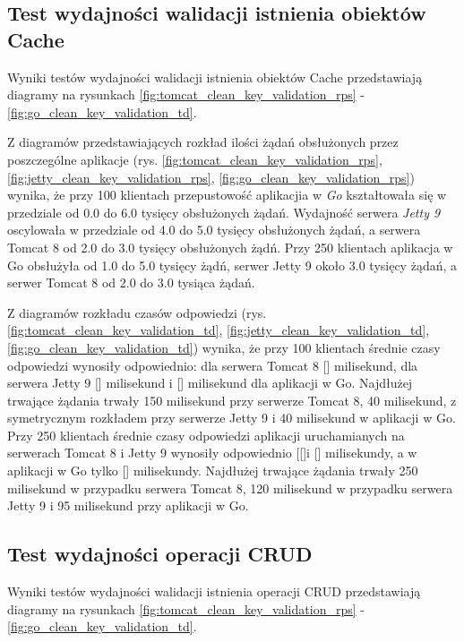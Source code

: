 \subsection{Test wydajności walidacji istnienia obiektów Cache}
Wyniki testów wydajności walidacji istnienia obiektów Cache przedstawiają diagramy na rysunkach \ref{fig:tomcat_clean_key_validation_rps} - \ref{fig:go_clean_key_validation_td}.              

Z diagramów przedstawiających rozkład ilości żądań obsłużonych przez poszczególne aplikacje  (rys. \ref{fig:tomcat_clean_key_validation_rps}, \ref{fig:jetty_clean_key_validation_rps}, \ref{fig:go_clean_key_validation_rps}) wynika, że przy 100 klientach przepustowość aplikacjia w \textsl{Go} kształtowała się w przedziale od 0.0 do 6.0 tysięcy obsłużonych żądań. Wydajność serwera \textsl{Jetty 9} oscylowała w przedziale od 4.0 do 5.0 tysięcy obsłużonych żądań, a  serwera Tomcat 8  od 2.0 do 3.0 tysięcy obsłużonych żądń.  Przy 250 klientach aplikacja w Go obsłużyła od 1.0 do 5.0 tysięcy żądń, serwer Jetty 9 około 3.0 tysięcy żądań, a serwer Tomcat 8 od 2.0 do 3.0 tysiąca żądań.

Z diagramów rozkładu czasów odpowiedzi (rys. \ref{fig:tomcat_clean_key_validation_td}, \ref{fig:jetty_clean_key_validation_td}, \ref{fig:go_clean_key_validation_td}) wynika, że przy 100 klientach średnie czasy odpowiedzi wynosiły odpowiednio: dla serwera Tomcat 8 [] milisekund, dla serwera Jetty 9 [] milisekund i [] milisekund dla aplikacji w Go.  Najdłużej trwające żądania trwały 150 milisekund przy serwerze Tomcat 8, 40 milisekund, z symetrycznym rozkładem przy serwerze  Jetty 9 i 40 milisekund  w aplikacji w Go. Przy 250 klientach średnie czasy odpowiedzi aplikacji uruchamianych na serwerach Tomcat 8 i Jetty 9  wynosiły odpowiednio [[]i [] milisekundy, a w aplikacji w Go tylko [] milisekundy. Najdłużej trwające żądania trwały 250 milisekund w przypadku serwera Tomcat 8, 120 milisekund w przypadku serwera Jetty 9 i 95 milisekund przy aplikacji w Go. 


\clearpage

\subsection{Test wydajności operacji CRUD}

Wyniki testów wydajności walidacji istnienia operacji CRUD przedstawiają diagramy na rysunkach \ref{fig:tomcat_clean_key_validation_rps} - \ref{fig:go_clean_key_validation_td}.              

